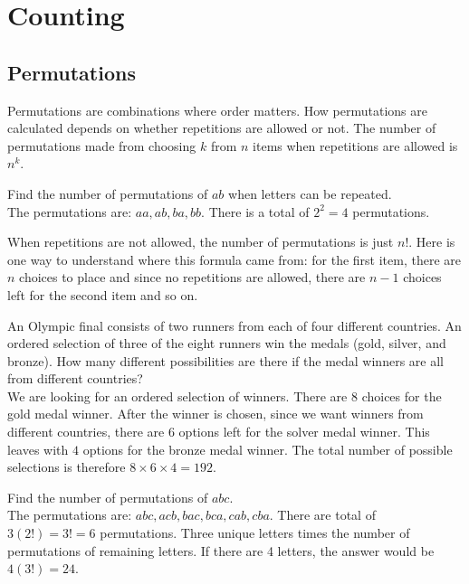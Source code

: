 \section{Counting}

\subsection{Permutations}

Permutations are combinations where order matters. How permutations are calculated depends on whether repetitions are allowed or not. The number of permutations made from choosing $k$ from $n$ items when repetitions are allowed is $n^k$.

\begin{texample}
	Find the number of permutations of $ab$ when letters can be repeated. \\
	
	The permutations are: $aa, ab, ba, bb$. There is a total of $2^2=4$ permutations.
\end{texample}

When repetitions are not allowed, the number of permutations is just $n!$. Here is one way to understand where this formula came from: for the first item, there are $n$ choices to place and since no repetitions are allowed, there are $n-1$ choices left for the second item and so on.

\begin{texample}
	An Olympic final consists of two runners from each of four different countries. An ordered selection of three of the eight runners win the medals (gold, silver, and bronze). How many different possibilities are there if the medal winners are all from different countries? \\
	
	We are looking for an ordered selection of winners. There are $8$ choices for the gold medal winner. After the winner is chosen, since we want winners from different countries, there are $6$ options left for the solver medal winner. This leaves with $4$ options for the bronze medal winner. The total number of possible selections is therefore $8\times6\times4=192$.
\end{texample}

\begin{texample}
	Find the number of permutations of $abc$. \\
	
	The permutations are: $abc, acb, bac, bca, cab, cba$. There are total of $3(2!)=3!=6$ permutations. Three unique letters times the number of permutations of remaining letters. If there are 4 letters, the answer would be $4(3!)=24$.
\end{texample}

